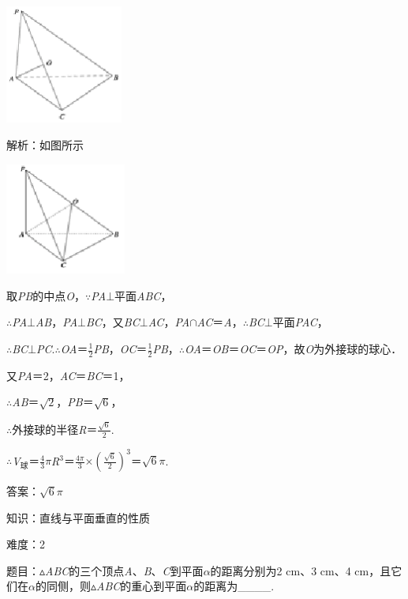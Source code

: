 \documentclass{article} %
\begin{document}
\includegraphics*[width=1.52in, height=1.55in, keepaspectratio=false]{image242}

解析：如图所示

\includegraphics*[width=1.56in, height=1.44in, keepaspectratio=false]{image243}

取\textit{PB}的中点\textit{O}，$\mathrm{\because}$\textit{PA}$\mathrm{\bot}$平面\textit{ABC}，

$\mathrm{\therefore}$\textit{PA}$\mathrm{\bot}$\textit{AB}，\textit{PA}$\mathrm{\bot}$\textit{BC}，又\textit{BC}$\mathrm{\bot}$\textit{AC}，\textit{PA}$\mathrm{\cap}$\textit{AC}＝\textit{A}，$\mathrm{\therefore}$\textit{BC}$\mathrm{\bot}$平面\textit{PAC}，

$\mathrm{\therefore}$\textit{BC}$\mathrm{\bot}$\textit{PC}.$\mathrm{\therefore}$\textit{OA}＝$\frac{1}{2}$\textit{PB}，\textit{OC}＝$\frac{1}{2}$\textit{PB}，$\mathrm{\therefore}$\textit{OA}＝\textit{OB}＝\textit{OC}＝\textit{OP}，故\textit{O}为外接球的球心．

又\textit{PA}＝2，\textit{AC}＝\textit{BC}＝1，

$\mathrm{\therefore}$\textit{AB}＝$\sqrt{2}$，\textit{PB}＝$\sqrt{6}$，

$\mathrm{\therefore}$外接球的半径\textit{R}＝$\frac{\sqrt{6}}{2}$.

$\mathrm{\therefore}$\textit{V}${}_{\textrm{球}}$＝$\frac{4}{3}\pi$\textit{R}${}^{3}$＝$\frac{4\pi}{3}\mathrm{\times}$$(\frac{\sqrt{6}}{2})^{3}$＝$\sqrt{6}\pi$.

答案：$\sqrt{6}\pi$

知识：直线与平面垂直的性质

难度：2

题目：$\mathrm{\vartriangle}$\textit{ABC}的三个顶点\textit{A}、\textit{B}、\textit{C}到平面\textit{$\alpha$}的距离分别为2 cm、3 cm、4 cm，且它们在\textit{$\alpha$}的同侧，则$\mathrm{\vartriangle}$\textit{ABC}的重心到平面\textit{$\alpha$}的距离为\_\_\_\_.
\end{document}
